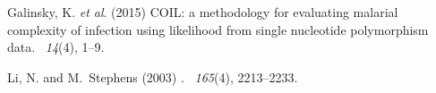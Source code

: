 \documentclass{article}
\begin{document}
\begin{thebibliography}{}

Galinsky, K. {\em et al}. (2015)
\newblock COIL: a methodology for evaluating malarial complexity of infection using likelihood from single nucleotide polymorphism data.
~{\em14\/}(4), 1--9.





Li, N. and M.~Stephens (2003)
.
~{\em 165\/}(4), 2213--2233.



\end{thebibliography}
\end{document}
